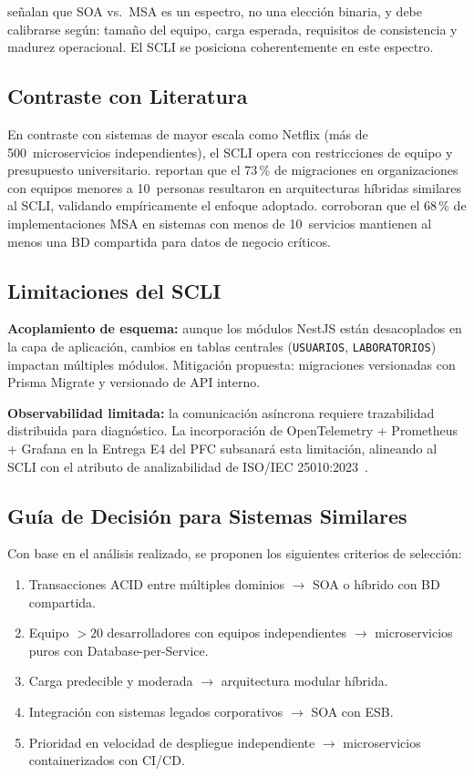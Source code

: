 \documentclass[conference,a4paper]{IEEEtran}
\begin{document}
\textcite{blinowski2022} se\~nalan que SOA vs.\ MSA es un
espectro, no una elecci\'on binaria, y debe calibrarse seg\'un:
tama\~no del equipo, carga esperada, requisitos de consistencia
y madurez operacional. El SCLI se posiciona coherentemente en
este espectro.

\subsection{Contraste con Literatura}

En contraste con sistemas de mayor escala como Netflix (m\'as
de 500~microservicios independientes), el SCLI opera con
restricciones de equipo y presupuesto universitario.
\textcite{aksakalli2021} reportan que el 73\,\% de migraciones
en organizaciones con equipos menores a 10~personas
resultaron en arquitecturas h\'ibridas similares al SCLI,
validando emp\'iricamente el enfoque adoptado.
\textcite{alshuqayran2016} corroboran que el 68\,\% de
implementaciones MSA en sistemas con menos de 10~servicios
mantienen al menos una BD compartida para datos de negocio
cr\'iticos.

\subsection{Limitaciones del SCLI}

\textbf{Acoplamiento de esquema:} aunque los m\'odulos NestJS
est\'an desacoplados en la capa de aplicaci\'on, cambios en
tablas centrales (\texttt{USUARIOS}, \texttt{LABORATORIOS})
impactan m\'ultiples m\'odulos. Mitigaci\'on propuesta:
migraciones versionadas con Prisma Migrate y versionado de
API interno.

\textbf{Observabilidad limitada:} la comunicaci\'on as\'incrona
requiere trazabilidad distribuida para diagn\'ostico. La
incorporaci\'on de OpenTelemetry + Prometheus + Grafana en la
Entrega E4 del PFC subsanar\'a esta limitaci\'on, alineando al
SCLI con el atributo de analizabilidad de ISO/IEC
25010:2023~\cite{iso25010}.

\subsection{Gu\'ia de Decisi\'on para Sistemas Similares}

Con base en el an\'alisis realizado, se proponen los siguientes
criterios de selecci\'on:

\begin{enumerate}[leftmargin=*]
  \item Transacciones ACID entre m\'ultiples dominios
    $\rightarrow$ SOA o h\'ibrido con BD compartida.
  \item Equipo $>20$ desarrolladores con equipos independientes
    $\rightarrow$ microservicios puros con Database-per-Service.
  \item Carga predecible y moderada $\rightarrow$ arquitectura
    modular h\'ibrida.
  \item Integraci\'on con sistemas legados corporativos
    $\rightarrow$ SOA con ESB.
  \item Prioridad en velocidad de despliegue independiente
    $\rightarrow$ microservicios containerizados con CI/CD.
\end{enumerate}
\end{document}
